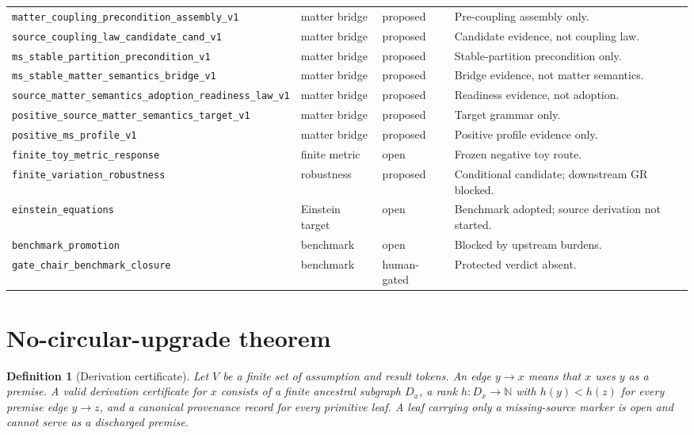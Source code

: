 \documentclass[11pt]{article}
\newtheorem{definition}{Definition}
\begin{document}
\begin{longtable}{@{}p{}p{}p{}p{}@{}}
\texttt{matter\_coupling\_precondition\_assembly\_v1} & matter bridge & proposed & Pre-coupling assembly only.\\
\texttt{source\_coupling\_law\_candidate\_cand\_v1} & matter bridge & proposed & Candidate evidence, not coupling law.\\
\texttt{ms\_stable\_partition\_precondition\_v1} & matter bridge & proposed & Stable-partition precondition only.\\
\texttt{ms\_stable\_matter\_semantics\_bridge\_v1} & matter bridge & proposed & Bridge evidence, not matter semantics.\\
\texttt{source\_matter\_semantics\_adoption\_readiness\_law\_v1} & matter bridge & proposed & Readiness evidence, not adoption.\\
\texttt{positive\_source\_matter\_semantics\_target\_v1} & matter bridge & proposed & Target grammar only.\\
\texttt{positive\_ms\_profile\_v1} & matter bridge & proposed & Positive profile evidence only.\\
\texttt{finite\_toy\_metric\_response} & finite metric & open & Frozen negative toy route.\\
\texttt{finite\_variation\_robustness} & robustness & proposed & Conditional candidate; downstream GR blocked.\\
\texttt{einstein\_equations} & Einstein target & open & Benchmark adopted; source derivation not started.\\
\texttt{benchmark\_promotion} & benchmark & open & Blocked by upstream burdens.\\
\texttt{gate\_chair\_benchmark\_closure} & benchmark & human-gated & Protected verdict absent.\\
\bottomrule
\end{longtable}
\normalsize

\section{No-circular-upgrade theorem}

\begin{definition}[Derivation certificate]
Let $V$ be a finite set of assumption and result tokens.  An edge
$y\to x$ means that $x$ uses $y$ as a premise.  A valid derivation
certificate for $x$ consists of a finite ancestral subgraph $D_x$, a rank
$h: D_x\to\mathbb{N}$ with $h(y)<h(z)$ for every premise edge $y\to z$,
and a canonical provenance record for every primitive leaf.  A leaf carrying
only a missing-source marker is open and cannot serve as a discharged premise.
\end{definition}
\end{document}
